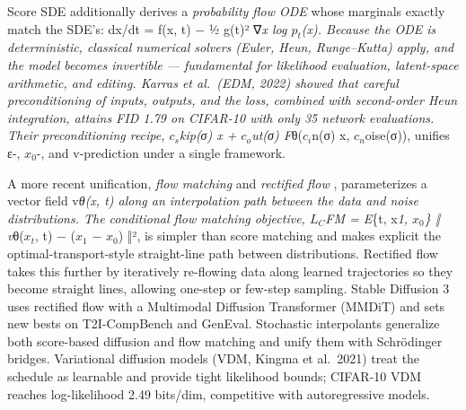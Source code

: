 \documentclass{article}
\begin{document}
Score SDE additionally derives a \emph{probability flow ODE} whose marginals exactly match the SDE's: dx/dt = f(x, t) − ½ g(t)² ∇\emph{x log \(p_t\)(x). Because the ODE is deterministic, classical numerical solvers (Euler, Heun, Runge--Kutta) apply, and the model becomes invertible --- fundamental for likelihood evaluation, latent-space arithmetic, and editing. Karras et al.~(EDM, 2022) showed that careful preconditioning of inputs, outputs, and the loss, combined with second-order Heun integration, attains FID 1.79 on CIFAR-10 with only 35 network evaluations. Their preconditioning recipe, \(c_s\)kip(σ) x + \(c_o\)ut(σ) F}θ(\(c_i\)n(σ) x, \(c_n\)oise(σ)), unifies ε-, \(x_0\)-, and v-prediction under a single framework.

A more recent unification, \emph{flow matching} \citep{lipman2023flowmatchingforgen} and \emph{rectified flow} \citep{liu2023zero1to3zeroshoton}, parameterizes a vector field v\emph{θ(x, t) along an interpolation path between the data and noise distributions. The conditional flow matching objective, \(L_C\)FM = E}\{t, x\emph{1, \(x_0\)\} ‖ v}θ(\(x_t\), t) − (\(x_1\) − \(x_0\)) ‖², is simpler than score matching and makes explicit the optimal-transport-style straight-line path between distributions. Rectified flow takes this further by iteratively re-flowing data along learned trajectories so they become straight lines, allowing one-step or few-step sampling. Stable Diffusion 3 \citep{esser20242024} uses rectified flow with a Multimodal Diffusion Transformer (MMDiT) and sets new bests on T2I-CompBench and GenEval. Stochastic interpolants \citep{albergo2023stochasticinterpol} generalize both score-based diffusion and flow matching and unify them with Schrödinger bridges. Variational diffusion models (VDM, Kingma et al.~2021) treat the schedule as learnable and provide tight likelihood bounds; CIFAR-10 VDM reaches log-likelihood 2.49 bits/dim, competitive with autoregressive models.
\end{document}
